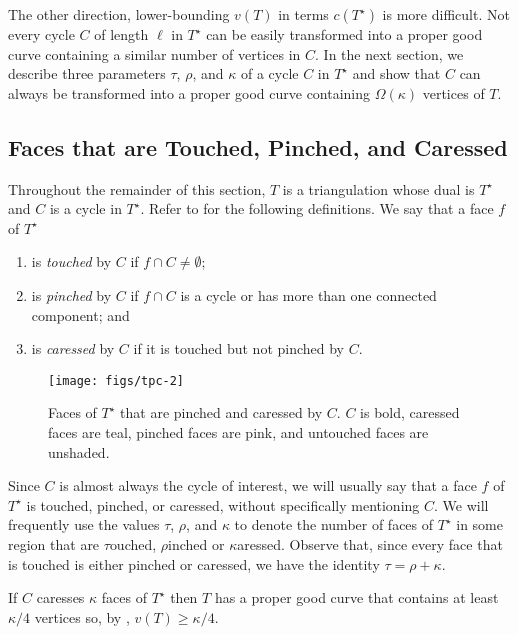 \documentclass{patmorin}
\newcommand{\dual}[1]{{#1}^\star}
\begin{document}
The other direction, lower-bounding $v(T)$ in terms $c(\dual{T})$
is more difficult. Not every cycle $C$ of length $\ell$ in $\dual{T}$
can be easily transformed into a proper good curve containing a similar
number of vertices in $C$.  In the next section, we describe three
parameters $\tau$, $\rho$, and $\kappa$ of a cycle $C$ in $\dual{T}$
and show that $C$ can always be transformed into a proper good curve
containing $\Omega(\kappa)$ vertices of $T$.

\subsection{Faces that are Touched, Pinched, and Caressed}

Throughout the remainder of this section, $T$ is a triangulation
whose dual is $\dual{T}$ and $C$ is a cycle in $\dual{T}$.
Refer to  for the following definitions.
We say that a face $f$ of $\dual{T}$
\begin{enumerate}
  \item is \emph{touched} by $C$ if $f\cap C\neq \emptyset$;
  \item is \emph{pinched} by $C$ if $f\cap C$ is a cycle or has more than 
    one connected component; and
  \item is \emph{caressed} by $C$ if it is touched but not pinched by $C$.
\end{enumerate}

\begin{figure}
  \begin{center}
    \texttt{[image: figs/tpc-2]}
  \end{center}
  \caption{Faces of $\dual{T}$ that are pinched and caressed by $C$. $C$
  is bold, caressed faces are teal, pinched faces are pink, and untouched
  faces are unshaded.} 
\end{figure}


Since $C$ is almost always the cycle of interest, we will usually say
that a face $f$ of $\dual{T}$ is touched, pinched, or caressed, without
specifically mentioning $C$.  We will frequently use the values $\tau$,
$\rho$, and $\kappa$ to denote the number of faces of $\dual{T}$ in
some region that are $\tau$ouched, $\rho$inched or $\kappa$aressed.
Observe that, since every face that is touched is either pinched or
caressed, we have the identity $\tau = \rho + \kappa$.

\begin{lem}
   If $C$ caresses $\kappa$ faces of $\dual{T}$ then $T$ has a proper
   good curve that contains at least $\kappa/4$ vertices so, by
   , $v(T)\ge \kappa/4$.
\end{lem}
\end{document}
